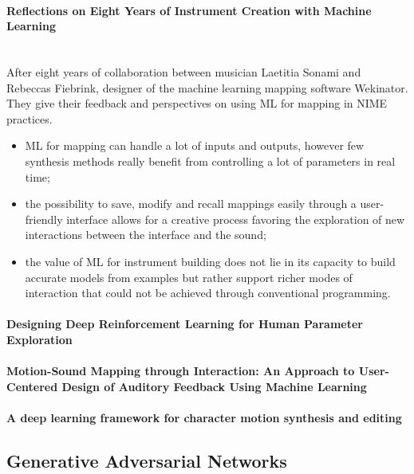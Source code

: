 \documentclass[11pt]{article}
\begin{document}
\paragraph{Reflections on Eight Years of Instrument Creation with Machine Learning} \citep{fiebrink_reflections_2020} \\
After eight years of collaboration between musician Laetitia Sonami and Rebeccas Fiebrink, designer of the machine learning mapping software Wekinator. They give their feedback and perspectives on using ML for mapping in NIME practices.
\begin{itemize}
    \item ML for mapping can handle a lot of inputs and outputs, however few synthesis methods really benefit from controlling a lot of parameters in real time;
    \item the possibility to save, modify and recall mappings easily through a user-friendly interface allows for a creative process favoring the exploration of new interactions between the interface and the sound;
    \item the value of ML for instrument building does not lie in its capacity to build accurate models from examples but rather support richer modes of interaction that could not be achieved through conventional programming.
\end{itemize}

\paragraph{Designing Deep Reinforcement Learning for Human Parameter Exploration} \citep{scurto_designing_2019}

\paragraph{Motion-Sound Mapping through Interaction: An Approach to User-Centered Design of Auditory Feedback Using Machine Learning} \citep{francoise_motion-sound_2018}

\paragraph{A deep learning framework for character motion synthesis and editing} \citep{holden_deep_2016}


\subsection{Generative Adversarial Networks}
\end{document}
